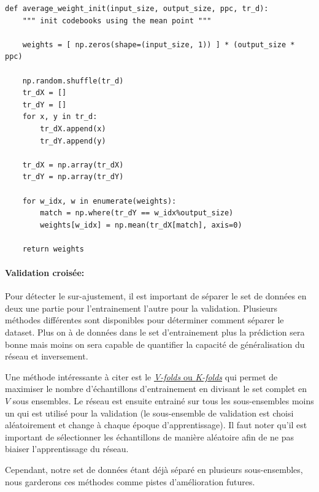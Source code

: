 \documentclass[11pt]{article}
\begin{document}
\begin{lstlisting}
def average_weight_init(input_size, output_size, ppc, tr_d):
    """ init codebooks using the mean point """

    weights = [ np.zeros(shape=(input_size, 1)) ] * (output_size * ppc)

    np.random.shuffle(tr_d)
    tr_dX = []
    tr_dY = []
    for x, y in tr_d:
        tr_dX.append(x)
        tr_dY.append(y)

    tr_dX = np.array(tr_dX)
    tr_dY = np.array(tr_dY)

    for w_idx, w in enumerate(weights):
        match = np.where(tr_dY == w_idx%output_size)
        weights[w_idx] = np.mean(tr_dX[match], axis=0)

    return weights
\end{lstlisting}
\newpage



\paragraph{Validation crois\'ee:} Pour d\'etecter le sur-ajustement, il est
important de s\'eparer le set de donn\'ees en deux une partie pour l'entrainement
l'autre pour la validation. Plusieurs m\'ethodes diff\'erentes sont disponibles
pour d\'eterminer comment s\'eparer le dataset. Plus on \`a de donn\'ees dans le set
d'entrainement plus la pr\'ediction sera bonne mais moins on sera capable de
quantifier la capacit\'e de g\'en\'eralisation du r\'eseau et inversement.

Une m\'ethode int\'eressante \`a citer est le \href{http://work.caltech.edu/slides/slides13.pdf}
{\emph{V-folds} ou \emph{K-folds}} qui permet de maximiser le nombre d'\'echantillons
d'entrainement en divisant le set complet en $V$ sous ensembles. Le r\'eseau est
ensuite entrain\'e sur tous les sous-ensembles moins un qui est utilis\'e pour la
validation (le sous-ensemble de validation est choisi al\'eatoirement et change
\`a chaque \'epoque d'apprentissage). Il faut noter qu'il est important de
s\'electionner les \'echantillons de mani\`ere al\'eatoire afin de ne pas biaiser
l'apprentissage du r\'eseau.

Cependant, notre set de donn\'ees \'etant d\'ej\`a s\'epar\'e en plusieurs sous-ensembles,
nous garderons ces m\'ethodes comme pistes d'am\'elioration futures.
\end{document}

